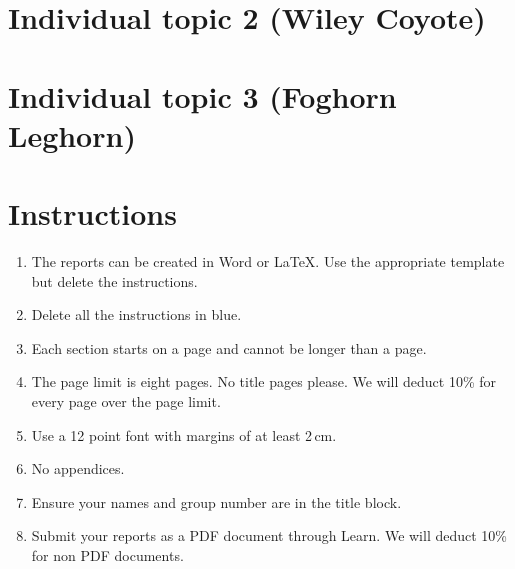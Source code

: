 \documentclass[a4paper,12pt]{article}
\begin{document}
\section{Individual topic 2 (Wiley Coyote)}


\section{Individual topic 3 (Foghorn Leghorn)}


\color{blue}
\section*{Instructions}

\begin{enumerate}
\item The reports can be created in Word or \LaTeX.  Use the
  appropriate template but delete the instructions.

\item Delete all the instructions in blue.

\item Each section starts on a page and cannot be longer than a page.

\item The page limit is eight pages.  No title pages please.  We will
  deduct 10\% for every page over the page limit.

\item Use a 12 point font with margins of at least 2\,cm.

\item No appendices.

\item Ensure your names and group number are in the title block.

\item Submit your reports as a PDF document through Learn.  We will
  deduct 10\% for non PDF documents.
\end{enumerate}
\end{document}
